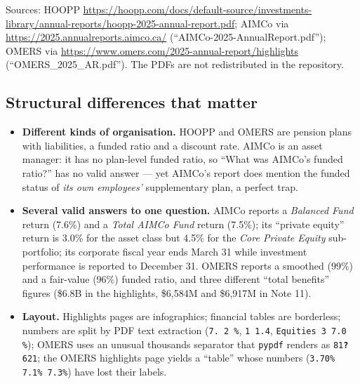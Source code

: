 \documentclass[11pt,a4paper]{article}
\begin{document}
\noindent Sources:
HOOPP \url{https://hoopp.com/docs/default-source/investments-library/annual-reports/hoopp-2025-annual-report.pdf};
AIMCo via \url{https://2025.annualreports.aimco.ca/} (``AIMCo-2025-AnnualReport.pdf'');
OMERS via \url{https://www.omers.com/2025-annual-report/highlights} (``OMERS\_2025\_AR.pdf'').
The PDFs are not redistributed in the repository.

\subsection{Structural differences that matter}
\begin{itemize}
  \item \textbf{Different kinds of organisation.} HOOPP and OMERS are pension plans with liabilities, a funded ratio
        and a discount rate. AIMCo is an asset manager: it has no plan-level funded ratio, so ``What was AIMCo's
        funded ratio?'' has no valid answer --- yet AIMCo's report does mention the funded status of \emph{its own
        employees'} supplementary plan, a perfect trap.
  \item \textbf{Several valid answers to one question.} AIMCo reports a \emph{Balanced Fund} return (7.6\%) and a
        \emph{Total AIMCo Fund} return (7.5\%); its ``private equity'' return is 3.0\% for the asset class but 4.5\%
        for the \emph{Core Private Equity} sub-portfolio; its corporate fiscal year ends March 31 while investment
        performance is reported to December 31. OMERS reports a smoothed (99\%) and a fair-value (96\%) funded ratio,
        and three different ``total benefits'' figures (\$6.8B in the highlights, \$6,584M and \$6,917M in Note 11).
  \item \textbf{Layout.} Highlights pages are infographics; financial tables are borderless; numbers are split by
        PDF text extraction (\texttt{7. 2 \%}, \texttt{1 1.4}, \texttt{Equities 3 7.0 \%}); OMERS uses an unusual
        thousands separator that \texttt{pypdf} renders as \texttt{81\textbf{?}621}; the OMERS highlights page
        yields a ``table'' whose numbers (\texttt{3.70\% 7.1\% 7.3\%}) have lost their labels.
\end{itemize}
\end{document}
